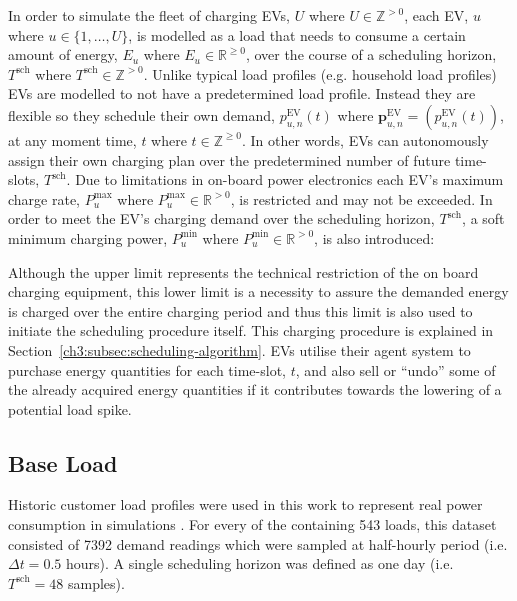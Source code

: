 In order to simulate the fleet of charging EVs, $U$ where $U \in \mathbb{Z}^{>0}$, each EV, $u$ where $u \in \{1, \dots, U\}$, is modelled as a load that needs to consume a certain amount of energy, $E_u$ where $E_u \in \mathbb{R}^{\geq0}$, over the course of a scheduling horizon, $T^\text{sch}$ where $T^\text{sch} \in \mathbb{Z}^{>0}$.
Unlike typical load profiles (e.g. household load profiles) EVs are modelled to not have a predetermined load profile.
Instead they are flexible so they schedule their own demand, $p^\text{EV}_{u,n}(t)$ where $\textbf{p}^\text{EV}_{u,n} = (p^\text{EV}_{u,n}(t))$, at any moment time, $t$ where $t \in \mathbb{Z}^{\geq0}$.
In other words, EVs can autonomously assign their own charging plan over the predetermined number of future time-slots, $T^\text{sch}$.
Due to limitations in on-board power electronics each EV's maximum charge rate, $P^\text{max}_{u}$ where $P^\text{max}_{u} \in \mathbb{R}^{>0}$, is restricted and may not be exceeded.
In order to meet the EV's charging demand over the scheduling horizon, $T^\text{sch}$, a soft minimum charging power, $P^\text{min}_{u}$ where $P^\text{min}_{u} \in \mathbb{R}^{>0}$, is also introduced:



Although the upper limit represents the technical restriction of the on board charging equipment, this lower limit is a necessity to assure the demanded energy is charged over the entire charging period and thus this limit is also used to initiate the scheduling procedure itself.
This charging procedure is explained in Section~\ref{ch3:subsec:scheduling-algorithm}.
EVs utilise their agent system to purchase energy quantities for each time-slot, $t$, and also sell or ``undo'' some of the already acquired energy quantities if it contributes towards the lowering of a potential load spike.

\subsection{Base Load}


Historic customer load profiles were used in this work to represent real power consumption in simulations \cite{IrishData2002}.
For every of the containing 543 loads, this dataset consisted of 7392 demand readings which were sampled at half-hourly period (i.e. $\Delta t = 0.5$ hours).
A single scheduling horizon was defined as one day (i.e. $T^\text{sch}=48$ samples).

